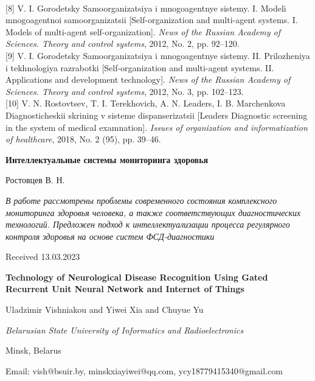 \documentclass{article}
\begin{document}
\begin{multicols*}{2}
{ }\\
 {\footnotesize [8] V. I. Gorodetsky Samoorganizatsiya i mnogoagentnye sistemy. I.
Modeli mnogoagentnoi samoorganizatsii [Self-organization and
multi-agent systems. I. Models of multi-agent self-organization].
\emph{News of the Russian Academy of Sciences. Theory and control
systems}, 2012, No. 2, pp. 92–120. }\\
{\footnotesize [9] V. I. Gorodetsky Samoorganizatsiya i mnogoagentnye sistemy.
II. Prilozheniya i tekhnologiya razrabotki [Self-organization and
multi-agent systems. II. Applications and development technology]. \emph{News of the Russian Academy of Sciences. Theory and
control systems}, 2012, No. 3, pp. 102–123.}\\
 {\footnotesize [10] V. N. Rostovtsev, T. I. Terekhovich, A. N. Leaders, I. B.
Marchenkova Diagnosticheskii skrining v sisteme dispanserizatsii
[Leaders Diagnostic screening in the system of medical examnation].\emph{ Issues of organization and informatization of healthcare},
2018, No. 2 (95), pp. 39–46.}
\begin{center}
   \textbf{Интеллектуальные системы мониторинга здоровья} %
\end{center}
\begin{center}
 Ростовцев В. Н.
\end{center}
\emph{В работе рассмотрены проблемы современного состояния
комплексного мониторинга здоровья человека, а также соответствующих диагностических технологий. Предложен подход к интеллектуализации процесса регулярного контроля
здоровья на основе систем ФСД-диагностики}
\begin{right}
  Received 13.03.2023
\end{right}
\end{multicols*}
\newpage
\begin{center}
\huge{\textbf{Technology of Neurological Disease Recognition Using Gated Recurrent Unit Neural Network and Internet of Things}}
\vspace{4mm} %
\end{center}
 \begin{center}
\large{Uladzimir Vishniakou and Yiwei Xia and Chuyue Yu

\textit{Belarusian State University of Informatics and Radioelectronics}

Minsk, Belarus

Email: vish@bsuir.by, minskxiayiwei@qq.com, ycy18779415340@gmail.com}
\end{center}
\end{document}
